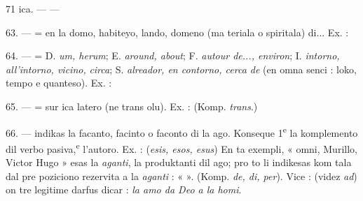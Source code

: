 \begin{VUpage}[75]{71}
\VUcontinue
ica. --- \cc
{} --- \nl
{}

\VUblanc{5.74pt}%
63. ---  = en la domo, habiteyo, lando, domeno (ma\cc
teriala o spiritala) di... Ex. : \nl
{}\nl
{}\nl
{}\nl
{}

\VUblanc{5.42pt}%
64. ---  = D. \textit{um, herum}; E. \textit{around, about};\nl
F. \textit{autour de..., environ}; I. \textit{intorno, all'intorno, vicino,}\nl
\textit{circa}; S. \textit{alreador, en contorno, cerca de} (en omna senci :\nl
loko, tempo e quanteso). Ex. : \nl
{}\nl
{}

\VUblanc{4.72pt}%
65. ---  = sur ica latero (ne trans olu). Ex. : \nl
{}\nl
{}\nl
(Komp. \textit{trans}.)

\VUblanc{4.90pt}%
66. ---  indikas la facanto, facinto o faconto di la\nl
ago. Konseque 1\textsuperscript{e} la komplemento dil verbo pasiva,\textsuperscript{e} l'autoro. Ex. :  (\textit{esis, esos, esus}) \nl
{} En ta\nl
exempli, « omni, Murillo, Victor Hugo » esas la \textit{aganti}, la\nl
produktanti dil ago; pro to li indikesas kom tala dal pre\cc
poziciono rezervita a la \textit{aganti} : «  ». (Komp. \textit{de, di, per}).\nl
Vice :  (videz \textit{ad}) on tre legitime\nl
darfus dicar : \textit{la amo da Deo a la homi}.


\end{VUpage}
